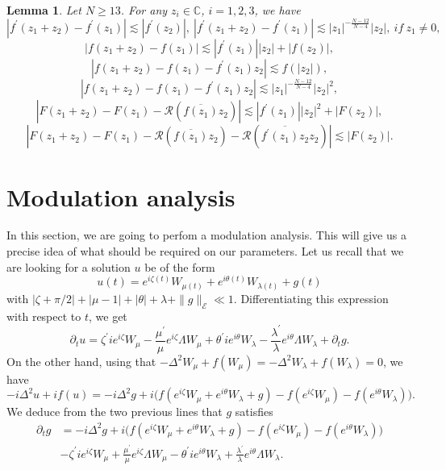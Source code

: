 \documentclass[a4paper,two-side,10pt]{amsart}
\newtheorem{lem}{Lemma}[section]
\numberwithin{equation}{section}
\begin{document}
\begin{lem}
Let $N\geq 13$. For any $z_i \in \mathbb{C}$, $i=1,2,3$, we have
\begin{equation}
\label{fe1}
|f^\prime (z_1 +z_2)-f^\prime (z_1)|\lesssim |f^\prime (z_2)|,\ |f^\prime (z_1 +z_2)-f^\prime (z_1)|\lesssim |z_1|^{-\frac{N-12}{N-4}} |z_2|,\ if\ z_1 \neq 0,
\end{equation}
\begin{equation}
\label{fe2}
|f(z_1 +z_2) - f(z_1)|\lesssim |f^\prime (z_1)||z_2|+|f(z_2)|,
\end{equation}
\begin{equation}
\label{fe3}
|f(z_1 +z_2) - f(z_1)-f^\prime (z_1) z_2|\lesssim f(|z_2|),
\end{equation}
\begin{equation}
\label{fe4}
|f(z_1 +z_2) - f(z_1) -f^\prime (z_1) z_2|\lesssim |z_1|^{-\frac{N-12}{N-4}}|z_2|^2,
\end{equation}
\begin{equation}
\label{fe5}
|F(z_1 +z_2) - F(z_1)- \mathcal{R} (\overline{f(z_1)} z_2)|\lesssim |f^\prime (z_1)||z_2|^2+|F(z_2)|,
\end{equation}
\begin{equation}
\label{fe6}
|F(z_1 +z_2) - F(z_1) - \mathcal{R} (\overline{f(z_1)} z_2) - \mathcal{R} (\overline{f^\prime (z_1) z_2}z_2 ) |\lesssim |F(z_2)|.
\end{equation}
\end{lem}





\section{Modulation analysis}
In this section, we are going to perfom a modulation analysis. This will give us a precise idea of what should be required on our parameters. Let us recall that we are looking for a solution $u$ be of the form
\[
u(t)= e^{i\zeta (t)}W_{\mu (t)} +e^{i\theta (t)} W_{\lambda (t)} +g(t)
\] 
with $|\zeta + \pi /2|+|\mu -1|+|\theta|+\lambda +\|g\|_{\mathcal{E}} \ll 1$.
 Differentiating this expression with respect to $t$, we get 
$$\partial_t u = \zeta^\prime i e^{i\zeta} W_\mu - \frac{\mu^\prime}{\mu} e^{i\zeta}\Lambda W_\mu +\theta^\prime i e^{i\theta} W_\lambda - \frac{\lambda^\prime}{\lambda}e^{i\theta} \Lambda W_\lambda +\partial_t g.$$
On the other hand, using that $-\Delta^2 W_\mu +f(W_\mu) = -\Delta^2 W_\lambda + f(W_\lambda)=0 $, we have
$$-i\Delta^2 u +i f(u)= -i\Delta^2 g +i\big(f(e^{i\zeta} W_\mu +e^{i\theta} W_\lambda +g) - f(e^{i\zeta} W_\mu )- f(e^{i\theta }W_\lambda)\big).$$
We deduce from the two previous lines that $g$ satisfies
\begin{align*}
\partial_t g &=-i \Delta^2 g +i\big(f(e^{i\zeta} W_\mu +e^{i\theta} W_\lambda +g) - f(e^{i\zeta} W_\mu ) - f(e^{i\theta }W_\lambda)\big)\\
&-  \zeta^\prime i e^{i\zeta} W_\mu + \frac{\mu^\prime}{\mu} e^{i\zeta}\Lambda W_\mu -\theta^\prime i e^{i\theta} W_\lambda + \frac{\lambda^\prime}{\lambda} e^{i\theta}\Lambda W_\lambda  .
\end{align*}
\end{document}
